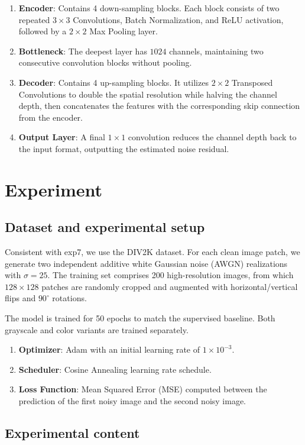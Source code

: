 \documentclass[conference]{IEEEtran}
\begin{document}
\begin{enumerate}
    \item \textbf{Encoder}: Contains 4 down-sampling blocks. Each block consists of two repeated $3 \times 3$ Convolutions, Batch Normalization, and ReLU activation, followed by a $2 \times 2$ Max Pooling layer.
    \item \textbf{Bottleneck}: The deepest layer has $1024$ channels, maintaining two consecutive convolution blocks without pooling.
    \item \textbf{Decoder}: Contains 4 up-sampling blocks. It utilizes $2 \times 2$ Transposed Convolutions to double the spatial resolution while halving the channel depth, then concatenates the features with the corresponding skip connection from the encoder.
    \item \textbf{Output Layer}: A final $1 \times 1$ convolution reduces the channel depth back to the input format, outputting the estimated noise residual.
\end{enumerate}

\section{Experiment}
\subsection{Dataset and experimental setup}
Consistent with exp7, we use the DIV2K dataset. For each clean image patch, we generate two independent additive white Gaussian noise (AWGN) realizations with $\sigma=25$. The training set comprises 200 high-resolution images, from which $128 \times 128$ patches are randomly cropped and augmented with horizontal/vertical flips and $90^\circ$ rotations.

The model is trained for 50 epochs to match the supervised baseline. Both grayscale and color variants are trained separately.
\begin{enumerate}
    \item \textbf{Optimizer}: Adam with an initial learning rate of $1 \times 10^{-3}$.
    \item \textbf{Scheduler}: Cosine Annealing learning rate schedule.
    \item \textbf{Loss Function}: Mean Squared Error (MSE) computed between the prediction of the first noisy image and the second noisy image.
\end{enumerate}

\subsection{Experimental content}
\end{document}
